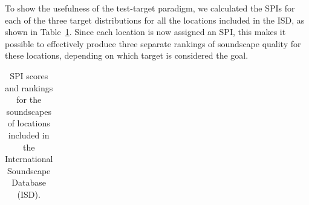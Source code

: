 \documentclass[
  authoryear,
  preprint,
  1p]{elsarticle}
\begin{document}
To show the usefulness of the test-target paradigm, we calculated the
SPIs for each of the three target distributions for all the locations
included in the ISD, as shown in Table~\ref{tbl-ex-spis}. Since each
location is now assigned an SPI, this makes it possible to effectively
produce three separate rankings of soundscape quality for these
locations, depending on which target is considered the goal.

\begin{longtable}[]{@{}
  >{\raggedleft\arraybackslash}p{}
  >{\raggedright\arraybackslash}p{}
  >{\raggedright\arraybackslash}p{}
  >{\raggedright\arraybackslash}p{}@{}}

\caption{\label{tbl-ex-spis}SPI scores and rankings for the soundscapes
of locations included in the International Soundscape Database (ISD).}

\tabularnewline


\end{longtable}
\end{document}
